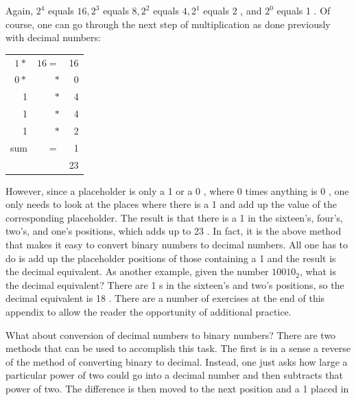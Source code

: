 \documentclass[10pt]{book}
\begin{document}
Again, $2^{4}$ equals $16,2^{3}$ equals $8,2^{2}$ equals $4,2^{1}$ equals 2 , and $2^{0}$ equals 1 . Of course, one can go through the next step of multiplication as done previously with decimal numbers:

\begin{center}
\begin{tabular}{rrr}
$1 *$ & $16=$ & 16 \\
$0 *$ & $*$ & 0 \\
1 & $*$ & 4 \\
1 & $*$ & 4 \\
1 & $*$ & 2 \\
\hline
sum & $=$ & 1 \\
\hline
 &  & 23 \\
\hline
\end{tabular}
\end{center}

However, since a placeholder is only a 1 or a 0 , where 0 times anything is 0 , one only needs to look at the places where there is a 1 and add up the value of the corresponding placeholder. The result is that there is a 1 in the sixteen's, four's, two's, and one's positions, which adds up to 23 . In fact, it is the above method that makes it easy to convert binary numbers to decimal numbers. All one has to do is add up the placeholder positions of those containing a 1 and the result is the decimal equivalent. As another example, given the number $10010_{2}$, what is the decimal equivalent? There are 1 s in the sixteen's and two's positions, so the decimal equivalent is 18 . There are a number of exercises at the end of this appendix to allow the reader the opportunity of additional practice.

What about conversion of decimal numbers to binary numbers? There are two methods that can be used to accomplish this task. The first is in a sense a reverse of the method of converting binary to decimal. Instead, one just asks how large a particular power of two could go into a decimal number and then subtracts that power of two. The difference is then moved to the next position and a 1 placed in
\end{document}
